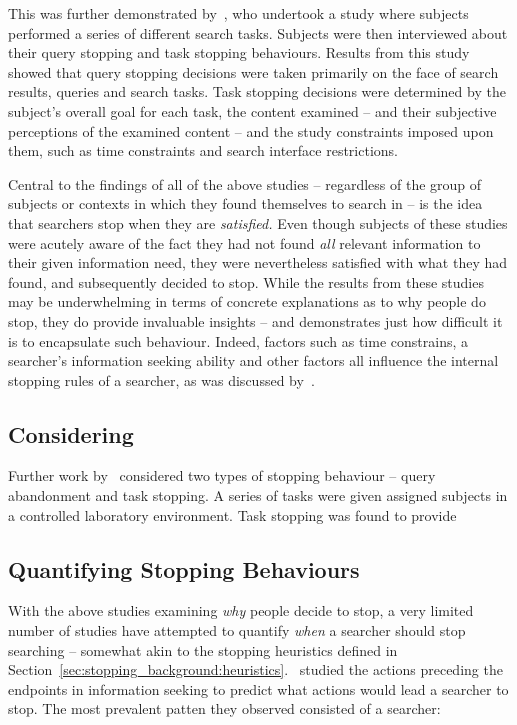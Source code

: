 This was further demonstrated by~\cite{wu2014information_scent}, who undertook a study where subjects performed a series of different search tasks. Subjects were then interviewed about their query stopping and task stopping behaviours. Results from this study showed that query stopping decisions were taken primarily on the face of search results, queries and search tasks. Task stopping decisions were determined by the subject's overall goal for each task, the content examined -- and their subjective perceptions of the examined content -- and the study constraints imposed upon them, such as time constraints and search interface restrictions.

Central to the findings of all of the above studies -- regardless of the group of subjects or contexts in which they found themselves to search in -- is the idea that searchers stop when they are \emph{satisfied.} Even though subjects of these studies were acutely aware of the fact they had not found \emph{all} relevant information to their given information need, they were nevertheless satisfied with what they had found, and subsequently decided to stop. While the results from these studies may be underwhelming in terms of concrete explanations as to why people do stop, they do provide invaluable insights -- and demonstrates just how difficult it is to encapsulate such behaviour. Indeed, factors such as time constrains, a searcher's information seeking ability and other factors all influence the internal stopping rules of a searcher, as was discussed by~\cite{marchionini1995information_seeking}.

\subsection{Considering~}
Further work by~\cite{wu2014stopping_query_abandonment} considered two types of stopping behaviour -- query abandonment and task stopping. A series of tasks were given assigned subjects in a controlled laboratory environment. Task stopping was found to provide 

\subsection{Quantifying Stopping Behaviours}
With the above studies examining \emph{why} people decide to stop, a very limited number of studies have attempted to quantify \emph{when} a searcher should stop searching -- somewhat akin to the stopping heuristics defined in Section~\ref{sec:stopping_background:heuristics}.~\cite{toms2009predicting_stopping} studied the actions preceding the endpoints in information seeking to predict what actions would lead a searcher to stop. The most prevalent patten they observed consisted of a searcher:

